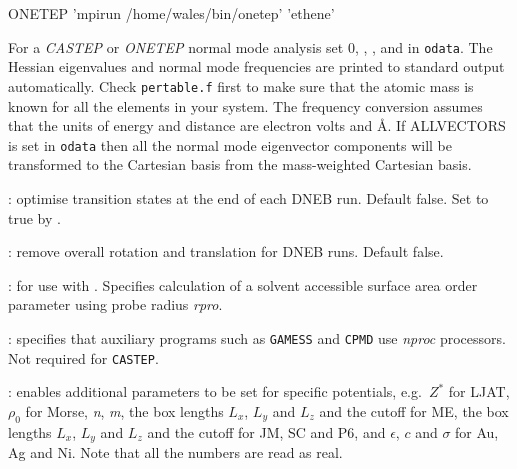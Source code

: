 {{{{\obeylines
ONETEP 'mpirun /home/wales/bin/onetep' 'ethene'
}

For a {\it CASTEP\/} or {\it ONETEP} normal mode analysis set
{ 0\/}, {}, {}, and {} in {\tt odata}.
The Hessian eigenvalues and normal mode frequencies are printed to standard output automatically.
Check {\tt pertable.f} first to make sure that the atomic mass is known for all the
elements in your system. The frequency conversion assumes that the units of energy and
distance are electron volts and \AA.
If { ALLVECTORS\/} is set in {\tt odata} then all
the normal mode eigenvector components will be transformed to the Cartesian basis from the
mass-weighted Cartesian basis.


: optimise transition states at the end of each DNEB run.
Default false. Set to true by .

: remove overall rotation and translation for DNEB runs. Default false.

: for use with . Specifies calculation of
a solvent accessible surface area order parameter using probe radius {\it rpro\/}.

: specifies that auxiliary programs such as {\tt GAMESS} and
{\tt CPMD} use {\it nproc\/} processors. Not required for {\tt CASTEP}.

: enables additional parameters to be set for
specific potentials, e.g.~$Z^*$ for LJAT, $\rho_0$ for Morse, {\it n\/}, {\it m\/}, the
box lengths $L_x$, $L_y$ and $L_z$ and the cutoff for ME, the
box lengths $L_x$, $L_y$ and $L_z$ and the cutoff for JM, SC and P6,
and $\epsilon$, $c$ and $\sigma$ for Au, Ag and Ni. Note that all the
numbers are read as real.

}}}
